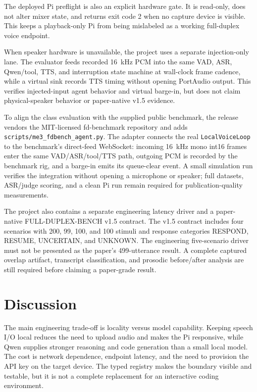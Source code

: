 \documentclass[sigconf,nonacm]{acmart}
\begin{document}
The deployed Pi preflight is also an explicit hardware gate. It is read-only,
does not alter mixer state, and returns exit code 2 when no capture device is
visible. This keeps a playback-only Pi from being mislabeled as a working
full-duplex voice endpoint.

When speaker hardware is unavailable, the project uses a separate
injection-only lane. The evaluator feeds recorded 16~kHz PCM into the same
VAD, ASR, Qwen/tool, TTS, and interruption state machine at wall-clock frame
cadence, while a virtual sink records TTS timing without opening PortAudio
output. This verifies injected-input agent behavior and virtual barge-in, but
does not claim physical-speaker behavior or paper-native v1.5 evidence.

\begin{sloppypar}
To align the class evaluation with the supplied public benchmark, the release
vendors the MIT-licensed fd-benchmark repository and adds
\texttt{scripts/me3\_fdbench\_agent.py}. The adapter connects the real
\texttt{LocalVoiceLoop} to the benchmark's direct-feed WebSocket: incoming
16~kHz mono int16 frames enter the same VAD/ASR/tool/TTS path, outgoing PCM is
recorded by the benchmark rig, and a barge-in emits its queue-clear event. A
small simulation run verifies the integration without opening a microphone or
speaker; full datasets, ASR/judge scoring, and a clean Pi run remain required
for publication-quality measurements.
\end{sloppypar}

The project also contains a separate engineering latency driver and a
paper-native FULL-DUPLEX-BENCH v1.5 contract. The v1.5 contract includes four
scenarios with 200, 99, 100, and 100 stimuli and response categories RESPOND,
RESUME, UNCERTAIN, and UNKNOWN. The engineering five-scenario driver must not
be presented as the paper's 499-utterance result. A complete captured overlap
artifact, transcript classification, and prosodic before/after analysis are
still required before claiming a paper-grade result.

\section{Discussion}

The main engineering trade-off is locality versus model capability. Keeping
speech I/O local reduces the need to upload audio and makes the Pi responsive,
while Qwen supplies stronger reasoning and code generation than a small local
model. The cost is network dependence, endpoint latency, and the need to
provision the API key on the target device. The typed registry makes the
boundary visible and testable, but it is not a complete replacement for an
interactive coding environment.
\end{document}
